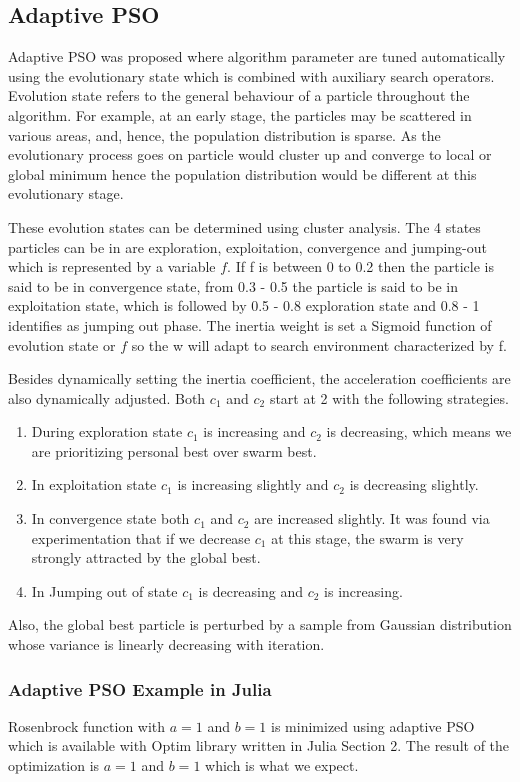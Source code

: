 \documentclass{article}
\begin{document}
\subsection{Adaptive PSO}
Adaptive PSO was proposed where algorithm parameter are tuned automatically using the evolutionary state which is combined with auxiliary search operators. Evolution state refers to the general behaviour of a particle throughout the algorithm. For example, at an early stage, the particles may be scattered in various
areas, and, hence, the population distribution is sparse. As the evolutionary process goes on particle would cluster up and converge to local or global minimum hence the population distribution would be different at this evolutionary stage. 

These evolution states can be determined using cluster analysis. The 4 states particles can be in are exploration, exploitation, convergence and jumping-out which is represented by a variable $f$. If f is between 0 to 0.2 then the particle is said to be in convergence state, from 0.3 - 0.5 the particle is said to be in exploitation state, which is followed by 0.5 - 0.8 exploration state and 0.8 - 1 identifies as jumping out phase.  The inertia weight is set a Sigmoid function of evolution state or $f$ so the w will adapt to search environment characterized by f.

Besides dynamically setting the inertia coefficient, the acceleration  coefficients are also dynamically adjusted. Both $c_1$ and $c_2$ start at 2 with the following strategies. 
\begin{enumerate}
    \item During exploration state $c_1$ is increasing and $c_2$ is decreasing, which means we are prioritizing personal best over swarm best.
    \item In exploitation state $c_1$ is increasing slightly and $c_2$ is decreasing slightly. 
    \item In convergence state both $c_1$ and $c_2$ are increased slightly. It was found via experimentation that if we decrease $c_1$ at this stage, the swarm is very strongly attracted by the global best.
    \item  In Jumping out of state $c_1$ is decreasing and $c_2$ is increasing.
\end{enumerate}
 Also, the global best particle is perturbed by a sample from Gaussian distribution whose variance is linearly decreasing with iteration.

\subsubsection{Adaptive PSO Example in Julia}
Rosenbrock function with $a = 1$ and $b=1$ is minimized using adaptive PSO which is available with Optim library written in Julia \cite{irfan_2021OJ} Section 2. The result of the optimization is $a=1$ and $b=1$ which is what we expect.
\end{document}
